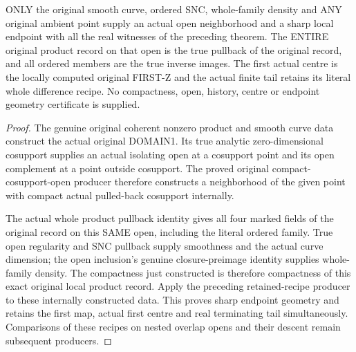 \begin{theorem}
\label{hir:sharp-original-curve-every-point-retained-local-recipe}
\leanok
ONLY the original smooth curve, ordered SNC, whole-family density and
ANY original ambient point supply an actual open neighborhood and a
sharp local endpoint with all the real witnesses of the preceding
theorem. The ENTIRE original product record on that open is the true
pullback of the original record, and all ordered members are the true
inverse images. The first actual centre is the locally computed
original FIRST-Z and the actual finite tail retains its literal whole
difference recipe. No compactness, open, history, centre or endpoint
geometry certificate is supplied.
\end{theorem}
\begin{proof}
The genuine original coherent nonzero product and smooth curve data
construct the actual original DOMAIN1. Its true analytic
zero-dimensional cosupport supplies an actual isolating open at a
cosupport point and its open complement at a point outside cosupport.
The proved original compact-cosupport-open producer therefore constructs
a neighborhood of the given point with compact actual pulled-back
cosupport internally.

The actual whole product pullback identity gives all four marked fields
of the original record on this SAME open, including the literal ordered
family. True open regularity and SNC pullback supply smoothness and the
actual curve dimension; the open inclusion's genuine closure-preimage
identity supplies whole-family density. The compactness just
constructed is therefore compactness of this exact original local
product record. Apply the preceding retained-recipe producer to these
internally constructed data. This proves sharp endpoint geometry and
retains the first map, actual first centre and real terminating tail
simultaneously. Comparisons of these recipes on nested overlap opens
and their descent remain subsequent producers.
\end{proof}
